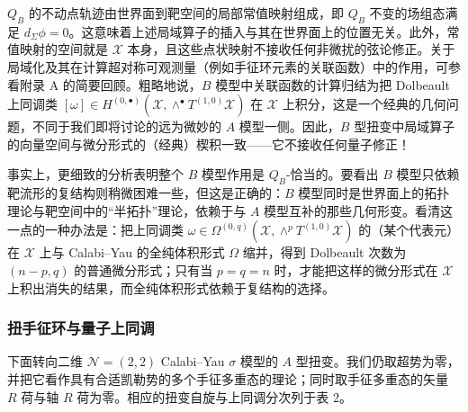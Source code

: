 $Q_B$ 的不动点轨迹由世界面到靶空间的局部常值映射组成，即 $Q_B$ 不变的场组态满足 $d_\Sigma\phi=0$。这意味着上述局域算子的插入与其在世界面上的位置无关。此外，常值映射的空间就是 $\mathcal{X}$ 本身，且这些点状映射不接收任何非微扰的弦论修正。关于局域化及其在计算超对称可观测量（例如手征环元素的关联函数）中的作用，可参看附录 A 的简要回顾。粗略地说，$B$ 模型中关联函数的计算归结为把 Dolbeault 上同调类 $[\omega]\in H^{(0,\bullet)}(\mathcal{X},\wedge^\bullet T^{(1,0)}\mathcal{X})$ 在 $\mathcal{X}$ 上积分，这是一个经典的几何问题，不同于我们即将讨论的远为微妙的 $A$ 模型一侧。因此，$B$ 型扭变中局域算子的向量空间与微分形式的（经典）楔积一致——它不接收任何量子修正！

事实上，更细致的分析表明整个 $B$ 模型作用是 $Q_B$-恰当的。要看出 $B$ 模型只依赖靶流形的复结构则稍微困难一些，但这是正确的：$B$ 模型同时是世界面上的拓扑理论与靶空间中的“半拓扑”理论，依赖于与 $A$ 模型互补的那些几何形变。看清这一点的一种办法是：把上同调类 $\omega\in\Omega^{(0,q)}(\mathcal{X},\wedge^pT^{(1,0)}\mathcal{X})$ 的（某个代表元）在 $\mathcal{X}$ 上与 Calabi--Yau 的全纯体积形式 $\Omega$ 缩并，得到 Dolbeault 次数为 $(n-p,q)$ 的普通微分形式；只有当 $p=q=n$ 时，才能把这样的微分形式在 $\mathcal{X}$ 上积出消失的结果，而全纯体积形式依赖于复结构的选择。

\subsubsection{扭手征环与量子上同调}

下面转向二维 $\mathcal{N}=(2,2)$ Calabi--Yau $\sigma$ 模型的 $A$ 型扭变。我们仍取超势为零，并把它看作具有合适凯勒势的多个手征多重态的理论；同时取手征多重态的矢量 $R$ 荷与轴 $R$ 荷为零。相应的扭变自旋与上同调分次列于表 2。

